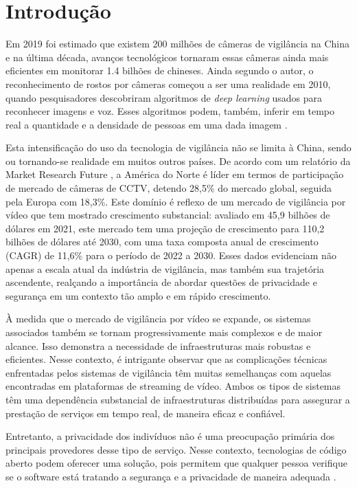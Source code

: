 \documentclass[12pt, %
openright, 
oneside, %
a4paper,    %
brazil]{facom-ufu-abntex2}
\begin{document}
\chapter[Introdução]{Introdução}
Em 2019 foi estimado que existem 200 milhões de câmeras de vigilância na China
e na última década, avanços tecnológicos tornaram essas câmeras ainda mais
eficientes em monitorar 1.4 bilhões de chineses. Ainda segundo o autor, o
reconhecimento de rostos por câmeras começou a ser uma realidade em 2010,
quando pesquisadores descobriram algoritmos de \textit{deep learning} usados
para reconhecer imagens e voz. Esses algoritmos podem, também, inferir em tempo
real a quantidade e a densidade de pessoas em uma dada imagem
\cite{qiang2019road}.

Esta intensificação do uso da tecnologia de vigilância não se limita à China,
sendo ou tornando-se realidade em muitos outros países. De acordo com um
relatório da Market Research Future \cite{Gupta2018}, a América do Norte é
líder em termos de participação de mercado de câmeras de CCTV, detendo 28,5\%
do mercado global, seguida pela Europa com 18,3\%. Este domínio é reflexo de um
mercado de vigilância por vídeo que tem mostrado crescimento substancial:
avaliado em 45,9 bilhões de dólares em 2021, este mercado tem uma projeção de
crescimento para 110,2 bilhões de dólares até 2030, com uma taxa composta anual
de crescimento (CAGR) de 11,6\% para o período de 2022 a 2030. Esses dados
evidenciam não apenas a escala atual da indústria de vigilância, mas também sua
trajetória ascendente, realçando a importância de abordar questões de
privacidade e segurança em um contexto tão amplo e em rápido crescimento.

À medida que o mercado de vigilância por vídeo se expande, os sistemas
associados também se tornam progressivamente mais complexos e de maior alcance.
Isso demonstra a necessidade de infraestruturas mais robustas e eficientes.
Nesse contexto, é intrigante observar que as complicações técnicas enfrentadas
pelos sistemas de vigilância têm muitas semelhanças com aquelas encontradas em
plataformas de streaming de vídeo. Ambos os tipos de sistemas têm uma
dependência substancial de infraestruturas distribuídas para assegurar a
prestação de serviços em tempo real, de maneira eficaz e confiável.

Entretanto, a privacidade dos indivíduos não é uma preocupação primária dos
principais provedores desse tipo de serviço. Nesse contexto, tecnologias de
código aberto podem oferecer uma solução, pois permitem que qualquer pessoa
verifique se o software está tratando a segurança e a privacidade de maneira
adequada \cite{mardjan2016open}.
\end{document}
